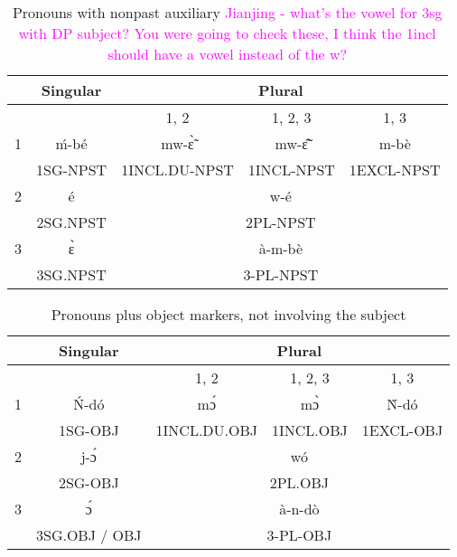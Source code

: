 \documentclass[12pt]{assets/fieldnotes}
\newcommand{\jal}[1]{\textcolor{Fuchsia}{#1}}
\begin{document}
\begin{table}[htb!]
    \centering
    \begin{tabular}{ccccc}
        \toprule
        & Singular & \multicolumn{3}{c}{Plural} \\
        \toprule 
        & & 1, 2 & 1, 2, 3 & 1, 3 \\  
        \cmidrule(r){3-3}
        \cmidrule(r){4-4} 
        \cmidrule(r){5-5}
        1 & ḿ-bé & mw-ɛ̃̀ & mw-ɛ̃̂ & m-bè \\
        & 1SG-NPST & 1INCL.DU-NPST & 1INCL-NPST & 1EXCL-NPST\\
        \midrule
        2 & é & \multicolumn{3}{c}{w-é} \\
        & 2SG.NPST & \multicolumn{3}{c}{2PL-NPST} \\
        \midrule
        3 & ɛ̀ & \multicolumn{3}{c}{à-m-bè}\\
         & 3SG.NPST & \multicolumn{3}{c}{3-PL-NPST} \\
        \bottomrule
    \end{tabular}
    \caption{Pronouns with nonpast auxiliary \jal{Jianjing - what's the vowel for 3sg with DP subject? You were going to check these, I think the 1incl should have a vowel instead of the w?}}
    \label{tab:fut}
\end{table}

\begin{table}[htb!]
    \centering
    \begin{tabular}{ccccc}
        \toprule
        & Singular & \multicolumn{3}{c}{Plural} \\
        \toprule 
        & & 1, 2 & 1, 2, 3 & 1, 3 \\  
        \cmidrule(r){3-3}
        \cmidrule(r){4-4} 
        \cmidrule(r){5-5}
        1 & Ń-dó & mɔ́ & mɔ̀ & Ǹ-dó \\
        & 1SG-OBJ & 1INCL.DU.OBJ & 1INCL.OBJ & 1EXCL-OBJ\\
        \midrule
        2 & j-ɔ́ & \multicolumn{3}{c}{wó} \\
         & 2SG-OBJ & \multicolumn{3}{c}{2PL.OBJ} \\
        \midrule
        3 & ɔ́ & \multicolumn{3}{c}{à-n-dò}\\
        & 3SG.OBJ / OBJ & \multicolumn{3}{c}{3-PL-OBJ} \\
        \bottomrule
    \end{tabular}
    \caption{Pronouns plus object markers, not involving the subject}
    \label{tab:fut}
\end{table} 
\end{document}
